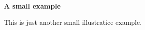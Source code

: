 \documentclass{article}
\begin{document}
\begin{huge}
\bfseries %
A small example

\end{huge}
\bigskip %
This is just another small illustratice example.
\end{document}
